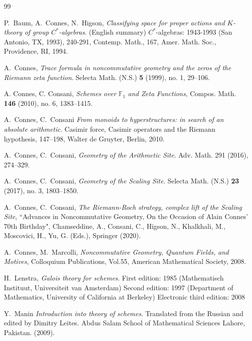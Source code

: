 \documentclass[12pt,english,reqno]{smfart}
\theoremstyle{plain}
\begin{document}
\begin{thebibliography}{99}

   P.~Baum, A.~Connes, N.~Higson,  \emph{ Classifying space for proper actions and $K$-theory of group
$C^*$-algebras}. (English summary)
$C^*$-algebras: 1943-1993 (San Antonio, TX, 1993), 240-291, Contemp. Math., 167, Amer. Math. Soc., Providence, RI, 1994.
 
 A.~Connes, \emph{Trace formula in noncommutative geometry and the zeros of the Riemann zeta function}.  Selecta Math. (N.S.)  \textbf{5}  (1999),  no. 1, 29--106.


 A. Connes, C. Consani, \emph{Schemes over $\mathbb F_1$ and Zeta Functions}, Compos. Math. \textbf{146} (2010), no. 6, 1383--1415.
 
  A.~Connes, C.~Consani  {\em  From monoids to hyperstructures: in search of an absolute arithmetic}. Casimir force, Casimir operators and the Riemann hypothesis, 147--198, Walter de Gruyter, Berlin, 2010.



 A.~Connes, C.~Consani, {\em Geometry of the Arithmetic Site}. Adv. Math. 291 (2016), 274--329.

 A.~Connes, C.~Consani, \emph{Geometry of the Scaling Site}.  Selecta Math. (N.S.) \textbf{23} (2017), no. 3, 1803--1850.

 A.~Connes, C.~Consani, \emph{The Riemann-Roch strategy, complex lift of the Scaling Site},  ``Advances in Noncommutative Geometry, On the Occasion of Alain Connes' 70th Birthday", Chamseddine, A., Consani, C., Higson, N., Khalkhali, M., Moscovici, H., Yu, G. (Eds.), Springer (2020). 



 A.~Connes, M.~Marcolli,  \emph{  Noncommutative Geometry, Quantum Fields, and Motives}, Colloquium Publications, Vol.55, American Mathematical Society, 2008.

 H.~Lenstra, {\em Galois theory for schemes}. First edition: 1985
(Mathematisch Instituut, Universiteit van Amsterdam)
Second edition: 1997
(Department of Mathematics, University of California at Berkeley)
Electronic third edition: 2008

 Y.~Manin {\em Introduction into theory of schemes}. Translated from the Russian and edited by Dimitry Leites. Abdus Salam School of Mathematical Sciences Lahore, Pakistan. (2009).


\end{thebibliography}
\end{document}
